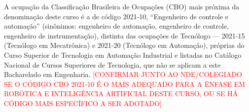 A ocupação da Classificação Brasileira de Ocupações (CBO) mais próxima da denominação deste curso é a de código 2021-10, ``Engenheiro de controle e automação'' (sinônimos: engenheiro de automação, engenheiro de controle, engenheiro de instrumentação), distinta das ocupações de Tecnólogo — 2021-15 (Tecnólogo em Mecatrônica) e 2021-20 (Tecnólogo em Automação), próprias do Curso Superior de Tecnologia em Automação Industrial e listadas no Catálogo Nacional de Cursos Superiores de Tecnologia, que não se aplicam a este Bacharelado em Engenharia. \textcolor{red}{[CONFIRMAR JUNTO AO NDE/COLEGIADO SE O CÓDIGO CBO 2021-10 É O MAIS ADEQUADO PARA A ÊNFASE EM ROBÓTICA E INTELIGÊNCIA ARTIFICIAL DESTE CURSO, OU SE HÁ CÓDIGO MAIS ESPECÍFICO A SER ADOTADO]}
